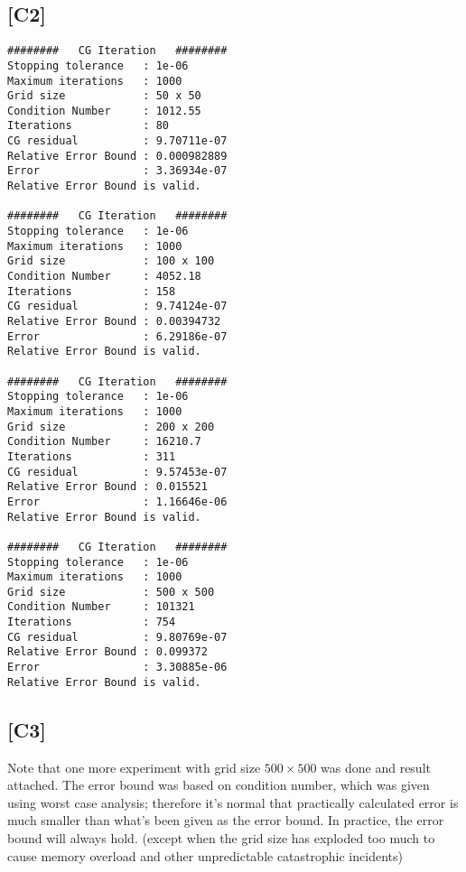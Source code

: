 \documentclass[12pt,a4paper]{article}
\newcommand{\x}{\times}
\begin{document}
\subsection*{[C2]}
\begin{verbatim}
########   CG Iteration   ########
Stopping tolerance   : 1e-06
Maximum iterations   : 1000
Grid size            : 50 x 50
Condition Number     : 1012.55
Iterations           : 80
CG residual          : 9.70711e-07
Relative Error Bound : 0.000982889
Error                : 3.36934e-07
Relative Error Bound is valid. 

########   CG Iteration   ########
Stopping tolerance   : 1e-06
Maximum iterations   : 1000
Grid size            : 100 x 100
Condition Number     : 4052.18
Iterations           : 158
CG residual          : 9.74124e-07
Relative Error Bound : 0.00394732
Error                : 6.29186e-07
Relative Error Bound is valid. 

########   CG Iteration   ########
Stopping tolerance   : 1e-06
Maximum iterations   : 1000
Grid size            : 200 x 200
Condition Number     : 16210.7
Iterations           : 311
CG residual          : 9.57453e-07
Relative Error Bound : 0.015521
Error                : 1.16646e-06
Relative Error Bound is valid. 

########   CG Iteration   ########
Stopping tolerance   : 1e-06
Maximum iterations   : 1000
Grid size            : 500 x 500
Condition Number     : 101321
Iterations           : 754
CG residual          : 9.80769e-07
Relative Error Bound : 0.099372
Error                : 3.30885e-06
Relative Error Bound is valid. 
\end{verbatim}
\subsection*{[C3]} Note that one more experiment with grid size $500\x 500$ was done and result attached. The error bound was based on condition number, which was given using worst case analysis; therefore it's normal that practically calculated error is much smaller than what's been given as the error bound. In practice, the error bound will always hold. (except when the grid size has exploded too much to cause memory overload and other unpredictable catastrophic incidents) 
\end{document}

